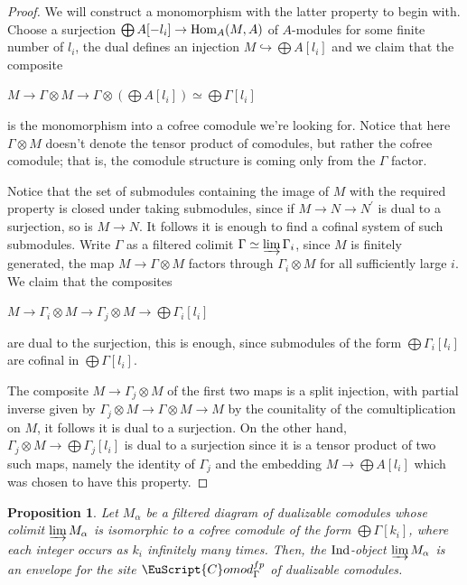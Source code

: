 \documentclass[oneside,a4paper]{amsart}
\newcommand{\euscr}[1]{\EuScript{#1}} %
\newcommand{\Hom}{\textnormal{Hom}} %
\newcommand{\Ind}{\textnormal{Ind}} %
\newcommand{\Comod}{\euscr{C}omod} %
\newcommand{\ComodGamma}{\Comod_{\Gamma}} %
\theoremstyle{plain}
\newtheorem{prop}[thm]{Proposition}
\theoremstyle{definition}
\theoremstyle{remark}
\begin{document}
\begin{proof}
We will construct a monomorphism with the latter property to begin with. Choose a surjection $\bigoplus A[-l_{i}] \rightarrow \Hom_{A}(M, A)$ of $A$-modules for some finite number of $l_{i}$, the dual defines an injection $M \hookrightarrow \bigoplus A[l_{i}]$ and we claim that the composite 

\begin{center}
$M \rightarrow \Gamma \otimes M \rightarrow \Gamma \otimes (\bigoplus A[l_{i}]) \simeq \bigoplus \Gamma[l_{i}]$ 
\end{center}
is the monomorphism into a cofree comodule we're looking for. Notice that here $\Gamma \otimes M$ doesn't denote the tensor product of comodules, but rather the cofree comodule; that is, the comodule structure is coming only from the $\Gamma$ factor. 

Notice that the set of submodules containing the image of $M$ with the required property is closed under taking submodules, since if $M \rightarrow N \rightarrow N^{\prime}$ is dual to a surjection, so is $M \rightarrow N$. It follows it is enough to find a cofinal system of such submodules. Write $\Gamma$ as a filtered colimit $\Gamma \simeq \varinjlim \Gamma_{i}$, since $M$ is finitely generated, the map $M \rightarrow \Gamma \otimes M$ factors through $\Gamma_{i} \otimes M$ for all sufficiently large $i$. We claim that the composites 

\begin{center}
$M \rightarrow \Gamma_{i} \otimes M \rightarrow \Gamma_{j} \otimes M \rightarrow \bigoplus \Gamma_{i}[l_{i}]$
\end{center}
are dual to the surjection, this is enough, since submodules of the form $\bigoplus \Gamma_{i}[l_{i}]$ are cofinal in $\bigoplus \Gamma[l_{i}]$. 

The composite $M \rightarrow \Gamma_{j} \otimes M$ of the first two maps is a split injection, with partial inverse given by $\Gamma_{j} \otimes M \rightarrow \Gamma \otimes M \rightarrow M$ by the counitality of the comultiplication on $M$, it follows it is dual to a surjection. On the other hand, $\Gamma_{j} \otimes M \rightarrow \bigoplus \Gamma_{j}[l_{i}]$ is dual to a surjection since it is a tensor product of two such maps, namely the identity of $\Gamma_{j}$ and the embedding $M \rightarrow \bigoplus A[l_{i}]$ which was chosen to have this property. 
\end{proof}

\begin{prop}
\label{prop:an_explicit_envelope_for_dualizable_comodules}
Let $M_{\alpha}$ be a filtered diagram of dualizable comodules whose colimit $\varinjlim M_{\alpha}$ is isomorphic to a cofree comodule of the form $\bigoplus \Gamma[k_{i}]$, where each integer occurs as $k_{i}$ infinitely many times. Then, the $\Ind$-object $\varinjlim M_{\alpha}$ is an envelope for the site $\ComodGamma^{fp}$ of dualizable comodules. 
\end{prop}
\end{document}
